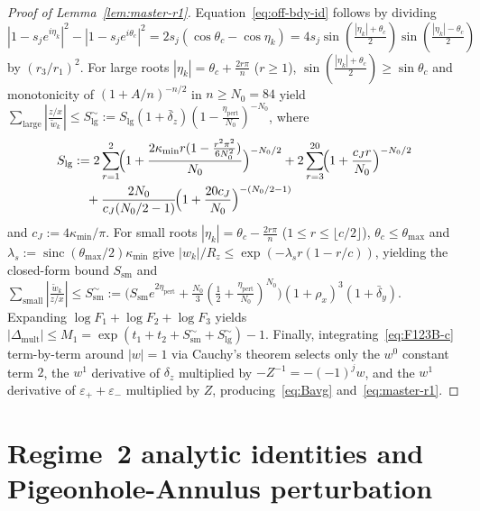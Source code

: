 \documentclass[10pt]{article}
\numberwithin{equation}{section}
\theoremstyle{plain}
\theoremstyle{definition}
\newcommand{\1}{\mathbf{1}}
\DeclareMathOperator{\sinc}{sinc}
\begin{document}
\begin{proof}[Proof of Lemma~\ref{lem:master-r1}]
Equation~\eqref{eq:off-bdy-id} follows by dividing $|1 - s_j e^{i\eta_k}|^2 - |1 - s_j e^{i\theta_c}|^2 = 2 s_j(\cos\theta_c - \cos\eta_k) = 4 s_j \sin(\frac{|\eta_k|+\theta_c}{2})\sin(\frac{|\eta_k|-\theta_c}{2})$ by $(r_3/r_1)^2$. For large roots $|\eta_k| = \theta_c + \frac{2r\pi}{n}$ ($r \ge 1$), $\sin(\frac{|\eta_k|+\theta_c}{2}) \ge \sin\theta_c$ and monotonicity of $(1 + A/n)^{-n/2}$ in $n \ge N_0 = 84$ yield $\sum_{\mathrm{large}}|\frac{z/x}{\tilde{w}_k}| \le S_{\mathrm{lg}}^\sim := S_{\mathrm{lg}}(1 + \bar{\delta}_z)(1 - \frac{\eta_{\mathrm{pert}}}{N_0})^{-N_0}$, where
\begin{align*}
S_{\mathrm{lg}} &:= 2\sum_{r=1}^{2}\!\Bigl(1 + \frac{2\kappa_{\min} r(1 - \frac{r^2\pi^2}{6 N_0^2})}{N_0}\Bigr)^{-N_0/2}
+ 2\sum_{r=3}^{20}\!\Bigl(1 + \frac{c_J r}{N_0}\Bigr)^{-N_0/2} \\
&\quad + \frac{2 N_0}{c_J(N_0/2 - 1)}\!\Bigl(1 + \frac{20 c_J}{N_0}\Bigr)^{-(N_0/2 - 1)}
\end{align*}
and $c_J := 4\kappa_{\min}/\pi$. For small roots $|\eta_k| = \theta_c - \frac{2r\pi}{n}$ ($1 \le r \le \lfloor c/2 \rfloor$), $\theta_c \le \theta_{\max}$ and $\lambda_s := \sinc(\theta_{\max}/2)\kappa_{\min}$ give $|w_k|/R_z \le \exp(-\lambda_s r(1 - r/c))$, yielding the closed-form bound $S_{\mathrm{sm}}$ and $\sum_{\mathrm{small}}|\frac{\tilde{w}_k}{z/x}| \le S_{\mathrm{sm}}^\sim := \bigl(S_{\mathrm{sm}} e^{2\eta_{\mathrm{pert}}} + \frac{N_0}{3}(\frac{1}{2} + \frac{\eta_{\mathrm{pert}}}{N_0})^{N_0}\bigr)(1 + \rho_x)^3(1 + \bar{\delta}_y)$. Expanding $\log F_1 + \log F_2 + \log F_3$ yields $|\Delta_{\mathrm{mult}}| \le M_1 = \exp(t_1 + t_2 + S_{\mathrm{sm}}^\sim + S_{\mathrm{lg}}^\sim) - 1$. Finally, integrating~\eqref{eq:F123B-c} term-by-term around $|w| = 1$ via Cauchy's theorem selects only the $w^0$ constant term $2$, the $w^1$ derivative of $\delta_z$ multiplied by $-Z^{-1} = -(-1)^j w$, and the $w^1$ derivative of $\varepsilon_+ + \varepsilon_-$ multiplied by $Z$, producing~\eqref{eq:Bavg} and~\eqref{eq:master-r1}.
\end{proof}

\section{Regime~2 analytic identities and Pigeonhole-Annulus perturbation}
\label{app:regime2}
\end{document}
